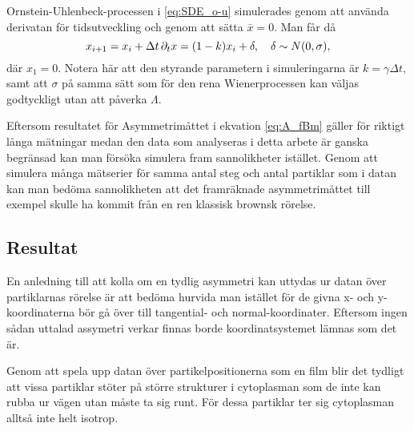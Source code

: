 Ornstein-Uhlenbeck-processen i \eqref{eq:SDE_o-u} simulerades genom att använda derivatan för tidsutveckling och genom att sätta $\bar{x}=0$. Man får då
\begin{equation}
x_{i+1} = x_i + \Delta{t}\,\pd_{t}x  = (1-k) x_i +  \delta 
\qcomma  \delta \sim N(0, \sigma),
\end{equation}
där $x_1=0$. Notera här att den styrande parametern i simuleringarna är $k=\gamma\Delta{t}$, samt att $\sigma$ på samma sätt som för den rena Wienerprocessen kan väljas godtyckligt utan att påverka $\varLambda$. 

Eftersom resultatet för Asymmetrimåttet i ekvation \eqref{eq:A_fBm} gäller för riktigt långa mätningar medan den data som analyseras i detta arbete är ganska begränsad kan man försöka simulera fram sannolikheter istället. Genom att simulera många mätserier för samma antal steg och antal partiklar som i datan kan man bedöma sannolikheten att det framräknade asymmetrimåttet till exempel skulle ha kommit från en ren klassisk brownsk rörelse. 

\subsection{Resultat}
En anledning till att kolla om en tydlig asymmetri kan uttydas ur datan över partiklarnas rörelse är att bedöma hurvida man istället för de givna x- och y-koordinaterna bör gå över till tangential- och normal-koordinater. Eftersom ingen sådan uttalad assymetri verkar finnas borde koordinatsystemet lämnas som det är.

Genom att spela upp datan över partikelpositionerna som en film blir det tydligt att vissa partiklar stöter på större strukturer i cytoplasman som de inte kan rubba ur vägen utan måste ta sig runt. För dessa partiklar ter sig cytoplasman alltså inte helt isotrop. 




\begin{comment}%
\section{Storleksberoende}


\subsection{Resultat}
\end{comment}


